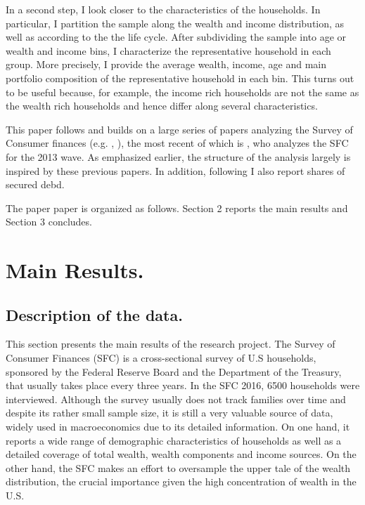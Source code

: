 \documentclass[11pt, a4paper, leqno]{article}
\begin{document}
    In a second step, I look closer to the characteristics of the households. In particular, I partition the sample along the wealth and income distribution, as well as according to the the life cycle. After subdividing the sample into age or wealth and income bins, I characterize the representative household in each group. More precisely, I provide the average wealth, income, age and main portfolio composition of the representative household in each bin. This turns out to be useful because, for example, the income rich households are not the same as the wealth rich households and hence differ along several characteristics. 

    This paper follows and builds on a large series of papers analyzing the Survey of Consumer finances (e.g. \citet{Diaz-Gimenez1997}, \citet{Diaz-Gimenez2011}), the most recent of which is \citet{Kuhn2016}, who analyzes the SFC for the 2013 wave. As emphasized earlier, the structure of the analysis largely is inspired by these previous papers. In addition, following \citet{Hintermaier2016} I also report shares of secured debd.

    The paper paper is organized as follows. Section 2 reports the main results and Section 3 concludes.


\section{Main Results.}
\label{sec:mainresults}

\subsection{Description of the data.}

This section presents the main results of the research project. The Survey of Consumer Finances (SFC) is a cross-sectional survey of U.S households, sponsored by the Federal Reserve Board and the Department of the Treasury, that usually takes place every three years. In the SFC 2016, 6500 households were interviewed. Although the survey usually does not track families over time and despite its rather small sample size, it is still a very valuable source of data, widely used in macroeconomics due to its detailed information. On one hand, it reports a wide range of demographic characteristics of households as well as a detailed coverage of total wealth, wealth components and income sources. On the other hand, the SFC makes an effort to oversample the upper tale of the wealth distribution, the crucial importance given the high concentration of wealth in the U.S. 
\end{document}
